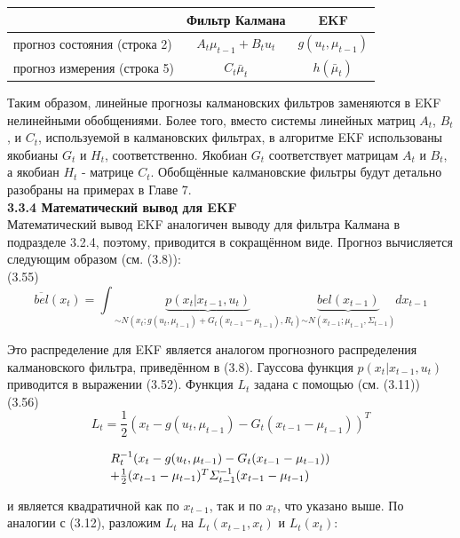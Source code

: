 \documentclass[10pt,a4paper]{article}
\begin{document}
\begin{table}[H]
\begin{center}
\begin{tabular}{l|c|c}
{}&Фильтр Калмана& EKF\\
\hline
прогноз состояния (строка 2)& $A_t\mu_{t-1}+B_t u_t$ & $g(u_t,\mu_{t-1})$ \\
прогноз измерения (строка 5)& $C_t\bar{\mu}_t$ & $h(\bar{\mu}_t)$
\end{tabular}
\end{center}
\end{table} 

Таким образом, линейные прогнозы калмановских фильтров заменяются в EKF нелинейными обобщениями. Более того, вместо системы линейных  матриц $A_t$, $B_t$, и $C_t$, используемой в калмановских фильтрах, в алгоритме EKF использованы якобианы $G_t$ и $H_t$, соответственно. Якобиан $G_t$ соответствует матрицам $A_t$ и $B_t$, а якобиан $H_t$ - матрице $C_t$. Обобщённые калмановские фильтры будут детально разобраны на примерах в Главе 7.\\

\textbf{3.3.4 Математический вывод для EKF}\\

Математический вывод EKF аналогичен выводу для фильтра Калмана в подразделе 3.2.4, поэтому, приводится в сокращённом виде. Прогноз вычисляется следующим образом (см. (3.8)):\\

(3.55)
$$\overline{bel}(x_t)=\int\underbrace{p(x_t|x_{t-1},u_t)}_{\sim N(x_t;g(u_t,\mu_{t-1})+G_t(x_{t-1}-\mu_{t-1}),R_t)}\underbrace{bel(x_{t-1})}_{\sim N(x_{t-1};\mu_{t-1},\varSigma_{t-1})} dx_{t-1}$$
 	
Это распределение для EKF является аналогом прогнозного распределения калмановского фильтра, приведённом в (3.8). Гауссова функция $p(x_t | x_{t-1},u_t)$ приводится в выражении (3.52). Функция $L_t$ задана с помощью (см. (3.11))\\

(3.56)
$$L_t=\frac{1}{2}(x_t-g(u_t,\mu_{t-1})-G_t(x_{t-1}-\mu_{t-1}))^T$$

$\hspace{29mm}R_t^{-1}(x_t-g(u_t,\mu_{t-1})-G_t(x_{t-1}-\mu_{t-1}))$\\

$\hspace{29mm}+\frac{1}{2}(x_{t-1}-\mu_{t-1})^T \varSigma_{t-1}^{-1}(x_{t-1}-\mu_{t-1})$

и является квадратичной как по $x_{t-1}$, так и по $x_t$, что указано выше. По аналогии с (3.12), разложим $L_t$ на $L_t(x_{t-1},x_t)$ и $L_t(x_t)$:\\
\end{document}
